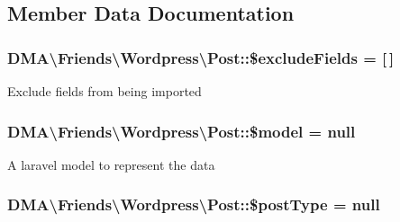 \subsection{Member Data Documentation}
\hypertarget{classDMA_1_1Friends_1_1Wordpress_1_1Post_ac9f76efeb858c94d5ab78e74b4301c16}{
\subsubsection[{\$exclude\+Fields}]{\setlength{\rightskip}{0pt plus 5cm}D\+M\+A\textbackslash{}\+Friends\textbackslash{}\+Wordpress\textbackslash{}\+Post\+::\$exclude\+Fields = \mbox{[}$\,$\mbox{]}\hspace{0.3cm}{\ttfamily [protected]}}}\label{classDMA_1_1Friends_1_1Wordpress_1_1Post_ac9f76efeb858c94d5ab78e74b4301c16}
Exclude fields from being imported \hypertarget{classDMA_1_1Friends_1_1Wordpress_1_1Post_a8a3df2e9db7f90d348d27ea9354176b1}{
\subsubsection[{\$model}]{\setlength{\rightskip}{0pt plus 5cm}D\+M\+A\textbackslash{}\+Friends\textbackslash{}\+Wordpress\textbackslash{}\+Post\+::\$model = null}}\label{classDMA_1_1Friends_1_1Wordpress_1_1Post_a8a3df2e9db7f90d348d27ea9354176b1}
A laravel model to represent the data \hypertarget{classDMA_1_1Friends_1_1Wordpress_1_1Post_a9b0ea251e8ba6b7161fc51ffa8fb72d8}{
\subsubsection[{\$post\+Type}]{\setlength{\rightskip}{0pt plus 5cm}D\+M\+A\textbackslash{}\+Friends\textbackslash{}\+Wordpress\textbackslash{}\+Post\+::\$post\+Type = null}}\label{classDMA_1_1Friends_1_1Wordpress_1_1Post_a9b0ea251e8ba6b7161fc51ffa8fb72d8}
